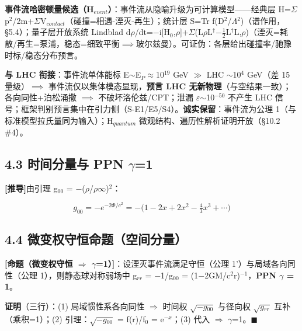 \documentclass[12pt]{article}
\newcommand{\mtag}[1]{\textbf{[#1]}}
\newcommand{\up}[1]{\ensuremath{^{#1}}}
\newcommand{\down}[1]{\ensuremath{_{#1}}}
\begin{document}
\textbf{事件流哈密顿量候选（H\down{event}）}：事件流从隐喻升级为可计算模型------经典层 H=\ensuremath{\Sigma}p\up{2}/2m+\ensuremath{\Sigma}V\down{contact}（碰撞=相遇-湮灭-再生）；统计层 S=Tr f(D\up{2}/\ensuremath{\Lambda}\up{2})（谱作用，\S{}5.4）；量子层开放系统 Lindblad d\ensuremath{\rho}/dt=\ensuremath{-}i[H\down{0},\ensuremath{\rho}]+\ensuremath{\Sigma}(L\ensuremath{\rho}L\ensuremath{^\dagger}\ensuremath{-}\ensuremath{\tfrac12}{L\ensuremath{^\dagger}L,\ensuremath{\rho}})（湮灭=耗散/再生=泵浦，稳态=细致平衡\ensuremath{\implies}玻尔兹曼）。可证伪：各层给出碰撞率/驰豫时标/稳态分布预言。

\textbf{与 LHC 衔接}：事件流单体能标 E\ensuremath{\sim}E\down{P}\ensuremath{\approx}10\up{19} GeV \ensuremath{\gg} LHC \ensuremath{\sim}10\up{4} GeV（差 15 量级）\ensuremath{\implies} 事件流仅以集体模态显现，\textbf{预言 LHC 无新物理}（与空结果一致）；各向同性+泊松涌撒 \ensuremath{\implies} 不破坏洛伦兹/CPT；泄漏 \ensuremath{\varepsilon}\ensuremath{\sim}10\up{-50} 不产生 LHC 信号；框架判别预言集中在引力侧（S-E1/E5/S4）。\textbf{诚实保留}：事件流为公理 1（与标准模型拉氏量同为输入）；H\down{quantum} 微观结构、遍历性解析证明开放（\S{}10.2 \#4）。

\subsection{4.3 时间分量与 PPN \ensuremath{\gamma}=1}

\mtag{推导}由引理 g\down{00} = \ensuremath{-}(\ensuremath{\rho}/\ensuremath{\rho}\ensuremath{\infty})\up{2}：

\[g_{00} = -e^{-2\Phi/c^2} = -\big(1 - 2x + 2x^2 - \tfrac43 x^3 + \cdots\big)\]

\subsection{4.4 微变权守恒命题（空间分量）}

\textbf{\mtag{命题（微变权守恒 \ensuremath{\Rightarrow} \ensuremath{\gamma}=1）}}：设湮灭事件流满足守恒（公理 1'）与局域各向同性（公理 1），则静态球对称弱场中 g\down{rr} = \ensuremath{-}1/g\down{00} = (1\ensuremath{-}2GM/c\up{2}r)\up{-1}，\textbf{PPN \ensuremath{\gamma} = 1}。

\textbf{证明}（三行）：(1) 局域惯性系各向同性 \ensuremath{\Rightarrow} 时间权 \ensuremath{\sqrt{-g\down{00}}} 与径向权 \ensuremath{\sqrt{g\down{rr}}} 互补（乘积=1）；(2) 引理：\ensuremath{\sqrt{-g\down{00}}} = f(r)/f\down{0} = e\up{-x}；(3) 代入 \ensuremath{\Rightarrow} \ensuremath{\gamma}=1。\ensuremath{\blacksquare}
\end{document}
